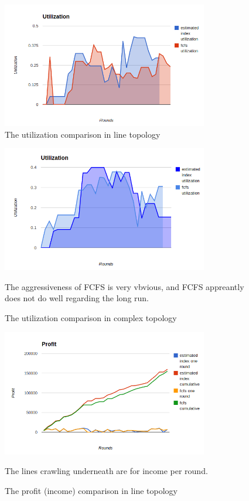 \documentclass[a4paper,11pt,twocolumn]{article}
\begin{document}
\begin{figure}[ht!]
\centering
\includegraphics[width=90mm]{line_utilization.png}
\caption{The utilization comparison in line topology}
\label{overflow}
\end{figure}

\begin{figure}[ht!]
\centering
\includegraphics[width=90mm]{mytopo_utilization.png}
\caption{The utilization comparison in complex topology}
The aggressiveness of FCFS is very vbvious, and FCFS appreantly does not do well regarding the long run.
\label{overflow}
\end{figure}

\begin{figure}[ht!]
\centering
\includegraphics[width=90mm]{line_profit.png}
\caption{The profit (income) comparison in line topology}
The lines crawling underneath are for income per round.
\label{overflow}
\end{figure}
\end{document}
